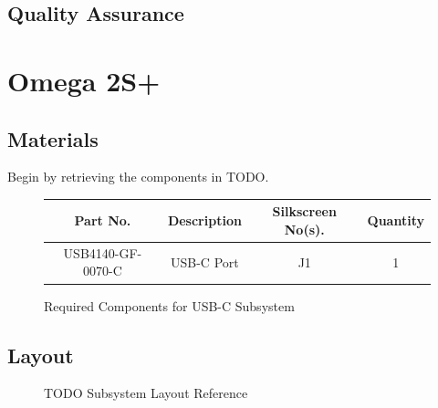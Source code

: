 \documentclass{article}
\begin{document}
\subsection{Quality Assurance}

\section{Omega 2S+}

\subsection{Materials}
Begin by retrieving the components in TODO.

\begin{figure}[H]
    \begin{center}
        \begin{tabular}{ c|c|c|c } 
            \textbf{Part No.} & \textbf{Description} & \textbf{Silkscreen No(s).} & \textbf{Quantity} \\ 
            \hline
            USB4140-GF-0070-C & USB-C Port & J1 & 1 \\ 
        \end{tabular}
    \end{center}
    \caption{Required Components for USB-C Subsystem}
    \label{tbl:TODO-materials}
\end{figure}

\subsection{Layout}

\begin{figure}[H]
    \centering
        \qquad
        \caption{TODO Subsystem Layout Reference}%
    \label{fig:TODO-layout}%
\end{figure}
\end{document}
